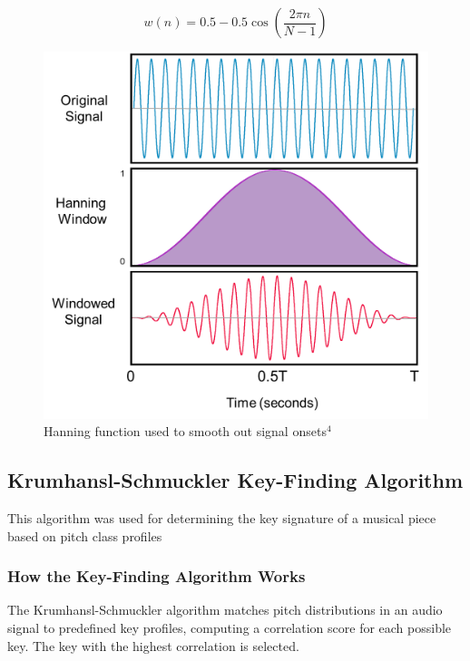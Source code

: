 \documentclass{article}
\begin{document}
\begin{equation}
w(n) = 0.5 - 0.5\cos\left(\frac{2\pi n}{N-1}\right)
\end{equation}

\begin{figure}[h]
\includegraphics[width=125mm,scale=0.5]{docs/LiteratureReview/images/hanning.png}
\caption{Hanning function used to smooth out signal onsets$^4$}
\end{figure}

\newpage

\subsection{Krumhansl-Schmuckler Key-Finding Algorithm}
This algorithm was used for determining the key signature of a musical piece based on pitch class profiles 

\subsubsection{How the Key-Finding Algorithm Works}
The Krumhansl-Schmuckler algorithm matches pitch distributions in an audio signal to predefined key profiles, computing a correlation score for each possible key. The key with the highest correlation is selected.
\end{document}
